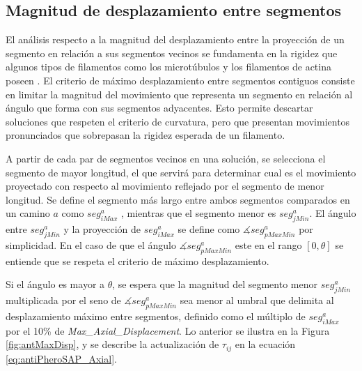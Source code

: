 \subsection{Magnitud de desplazamiento entre segmentos}
El an\'alisis respecto a la magnitud del desplazamiento entre la proyecci\'on de un segmento en relaci\'on a sus segmentos vecinos se fundamenta en la rigidez que algunos tipos de filamentos como los microt\'ubulos y los filamentos de actina poseen \cite{stam2017filament}. El criterio de m\'aximo desplazamiento entre segmentos contiguos consiste en limitar la magnitud del movimiento que representa un segmento en relaci\'on al \'angulo que forma con sus segmentos adyacentes. Esto permite descartar soluciones que respeten el criterio de curvatura, pero que presentan movimientos pronunciados que sobrepasan la rigidez esperada de un filamento.

A partir de cada par de segmentos vecinos en una soluci\'on, se  selecciona el segmento de mayor longitud, el que servir\'a para determinar cual es el movimiento proyectado con respecto al movimiento reflejado por el segmento de menor longitud. Se define el segmento m\'as largo entre ambos segmentos comparados en un camino $a$ como $seg^{a}_{iMax}$ , mientras que el segmento menor es $seg^{a}_{jMin}$. El \'angulo entre $seg^{a}_{jMin}$ y la proyecci\'on de $seg^{a}_{iMax}$ se define como 
$\measuredangle seg^{a}_{pMaxMin}$ por simplicidad. En el caso de que el \'angulo $\measuredangle seg^{a}_{pMaxMin}$ este en el rango $[0, \theta]$ se entiende que se respeta el criterio de m\'aximo desplazamiento.


Si el \'angulo es mayor a $\theta$, se espera que la magnitud del segmento menor $seg^{a}_{jMin}$ multiplicada por el seno de $\measuredangle seg^{a}_{pMaxMin}$ sea menor al umbral que delimita al desplazamiento m\'aximo entre segmentos, definido como el m\'ultiplo de $seg^{a}_{iMax}$ por el 10\% de {\it Max\_Axial\_Displacement}. Lo anterior se ilustra en la Figura \ref{fig:antMaxDisp}, y se describe la actualizaci\'on de $\tau_{ij}$ en la ecuaci\'on \ref{eq:antiPheroSAP_Axial}.


